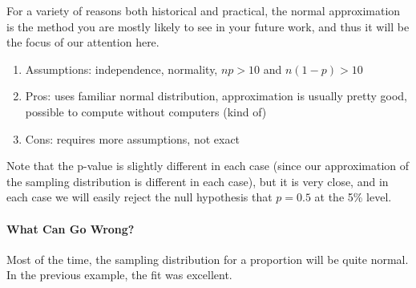 \documentclass[10pt]{article}\usepackage[]{graphicx}\usepackage[]{color}
\begin{document}
\begin{enumerate}
For a variety of reasons both historical and practical, the normal approximation is the method you are mostly likely to see in your future work, and thus it will be the focus of our attention here. 

 \begin{enumerate}
    \item Assumptions: independence, normality, $np > 10$ and $n(1-p) > 10$
    \item Pros: uses familiar normal distribution, approximation is usually pretty good, possible to compute without computers (kind of)
    \item Cons: requires more assumptions, not exact
  \end{enumerate}

\end{enumerate}

Note that the p-value is slightly different in each case (since our approximation of the sampling distribution is different in each case), but it is very close, and in each case we will easily reject the null hypothesis that $p = 0.5$ at the 5\% level. 

\paragraph{What Can Go Wrong?}

Most of the time, the sampling distribution for a proportion will be quite normal. In the previous example, the fit was excellent.
\end{document}

